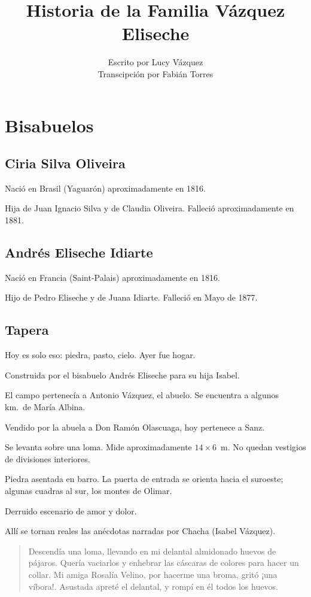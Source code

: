 \documentclass[a4paper]{article}
\title{Historia de la Familia Vázquez Eliseche}
\author{Escrito por Lucy Vázquez\\ Transcipción por Fabián Torres}
\date{}
\begin{document}
\maketitle
\newpage
\tableofcontents
\newpage

\section{Bisabuelos}

\subsection{Ciria Silva Oliveira}

Nació en Brasil (Yaguarón) aproximadamente en 1816.

Hija de Juan Ignacio Silva y de Claudia Oliveira. Falleció aproximadamente en 1881.

\subsection{Andrés Eliseche Idiarte}

Nació en Francia (Saint-Palais) aproximadamente en 1816.

Hijo de Pedro Eliseche y de Juana Idiarte. Falleció en Mayo de 1877.

\subsection{Tapera}

Hoy es solo eso: piedra, pasto, cielo. Ayer fue hogar.

Construida por el bisabuelo Andrés Eliseche para su hija Isabel.

El campo pertenecía a Antonio Vázquez, el abuelo. Se encuentra a algunos km.\ de María Albina.

Vendido por la abuela a Don Ramón Olascuaga, hoy pertenece a Sanz.

Se levanta sobre una loma. Mide aproximadamente $14\times6$~m. No quedan vestigios de divisiones interiores.

Piedra asentada en barro. La puerta de entrada se orienta hacia el suroeste; algunas cuadras al sur, los montes de Olimar.

Derruido escenario de amor y dolor.

Allí se tornan reales las anécdotas narradas por Chacha (Isabel Vázquez).

\begin{quote}
    Descendía una loma, llevando en mi delantal almidonado huevos de pájaros. Quería vaciarlos y enhebrar las cáscaras de colores para hacer un collar. Mi amiga Rosalía Velino, por hacerme una broma, gritó ¡una víbora!. Asustada apreté el delantal, y rompí en él todos los huevos.
\end{quote}
\end{document}
